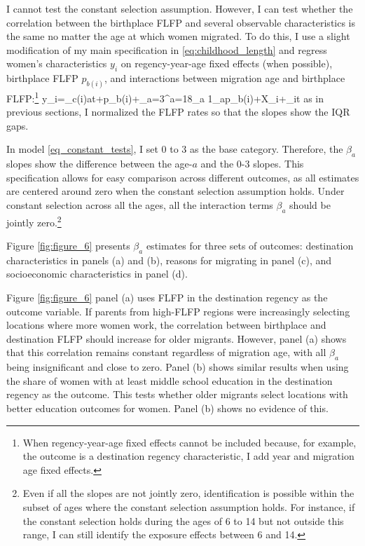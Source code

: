 I cannot test the constant selection assumption. However, I can test whether the correlation between the birthplace FLFP and several observable characteristics is the same no matter the age at which women migrated. To do this, I use a slight modification of my main specification in \eqref{eq:childhood_length} and regress women's characteristics $y_i$ on regency-year-age fixed effects (when possible), birthplace FLFP $p_{b(i)}$, and interactions between migration age and birthplace FLFP:\footnote{When regency-year-age fixed effects cannot be included because, for example, the outcome is a destination regency characteristic, I add year and migration age fixed effects.} 
\beqn
\label{eq_constant_tests}
y_{i}=\omega_{c(i)at}+\beta p_{b(i)}+\sum_{a=3}^{a=18}\beta_a 1_a\times p_{b(i)}+X_i\kappa+\varepsilon_{it}
\eeqn
as in previous sections, I normalized the FLFP rates so that the slopes show the IQR gaps.


In model \eqref{eq_constant_tests}, I set 0 to 3 as the base category. Therefore, the $\beta_a$ slopes show the difference between the age-$a$ and the 0-3 slopes. This specification allows for easy comparison across different outcomes, as all estimates are centered around zero when the constant selection assumption holds. Under constant selection across all the ages,  {all the interaction terms $\beta_a$ should be jointly zero}.\footnote{Even if all the slopes are not jointly zero, identification is possible within the subset of ages where the constant selection assumption holds. For instance, if the constant selection holds during the ages of 6 to 14 but not outside this range,  I can still identify the exposure effects between 6 and 14.}


Figure \ref{fig:figure_6} presents  $\beta_a$ estimates for three sets of outcomes: destination characteristics in panels (a) and (b), reasons for migrating in panel (c), and socioeconomic characteristics in panel (d). 

\tftext{}



Figure \ref{fig:figure_6} panel (a) uses FLFP in the destination regency as the outcome variable. If parents from high-FLFP regions were increasingly selecting locations where more women work, the correlation between birthplace and destination FLFP should increase for older migrants. However, panel (a) shows that this correlation remains constant regardless of migration age, with all $\beta_a$ being insignificant and close to zero. Panel (b) shows similar results when using the share of women with at least middle school education in the destination regency as the outcome. This tests whether older migrants select locations with better education outcomes for women. Panel (b) shows no evidence of this.

